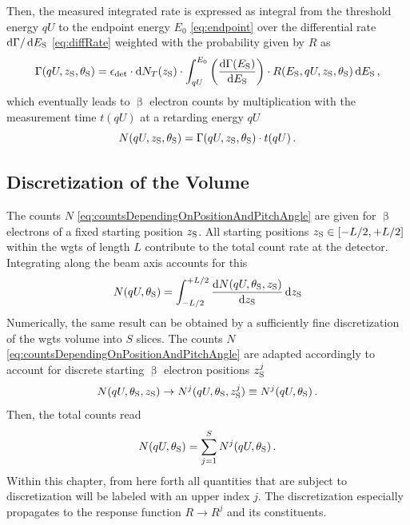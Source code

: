 Then, the measured integrated rate is expressed as integral from the threshold energy $qU$ to the endpoint energy $E_0$ \eqref{eq:endpoint} over the differential rate $\mathop{}\!\mathrm{d} \Gamma / \mathop{}\!\mathrm{d} E_\mathrm{S}$ \eqref{eq:diffRate} weighted with the probability given by $R$ as
\begin{equation}
\label{eq:rateDependingOnstartingValues}
\Gamma(qU, z_\mathrm{S}, \theta_\mathrm{S}) = 
\epsilon_\mathrm{det} \cdot
\mathop{}\!\mathrm{d} N_T(z_\mathrm{S}) \cdot
\int_{qU}^{E_0} 
    \left(\frac{\mathop{}\!\mathrm{d} \Gamma(E_\mathrm{S})}{\mathop{}\!\mathrm{d} E_\mathrm{S}}\right) \cdot 
    R(E_\mathrm{S}, qU, z_\mathrm{S}, \theta_\mathrm{S}) 
\mathop{}\!\mathrm{d} E_\mathrm{S}
\text{\,,}
\end{equation}
which eventually leads to $\upbeta$ electron counts by multiplication with the measurement time $t(qU)$ at a retarding energy $qU$
\begin{equation}
    \label{eq:countsDependingOnPositionAndPitchAngle}
    N(qU, z_\mathrm{S}, \theta_\mathrm{S}) = \Gamma(qU, z_\mathrm{S}, \theta_\mathrm{S}) \cdot t(qU)
    \text{\,.}
\end{equation}

\subsection{Discretization of the  Volume}
\label{sec:sourceDiscretization}
The counts $N$ \eqref{eq:countsDependingOnPositionAndPitchAngle} are given for $\upbeta$ electrons of a fixed starting position $z_\mathrm{S}$.
All starting positions $z_\mathrm{S} \in [-L/2, +L/2]$ within the \gls{wgts} of length $L$ contribute to the total count rate at the detector. Integrating along the beam axis accounts for this
\begin{equation}
    N(qU, \theta_\mathrm{S}) = \int_{-L/2}^{+L/2} \frac{\mathop{}\!\mathrm{d} N(qU, \theta_\mathrm{S}, z_\mathrm{S})}{\mathop{}\!\mathrm{d} z_\mathrm{S}} \mathop{}\!\mathrm{d} z_\mathrm{S}
\end{equation}
Numerically, the same result can be obtained by a sufficiently fine discretization of the \gls{wgts} volume into $S$ slices. The counts $N$ \eqref{eq:countsDependingOnPositionAndPitchAngle} are adapted accordingly to account for discrete starting $\upbeta$ electron positions $z_\mathrm{S}^j$
\begin{equation}
    N(qU, \theta_\mathrm{S}, z_\mathrm{S}) \rightarrow N^j(qU, \theta_\mathrm{S},z_\mathrm{S}^j) \equiv N^j(qU, \theta_\mathrm{S}) \text{\,.}
\end{equation}
Then, the total counts read
\begin{equation}
    \label{eq:nonAveragedCounts}
    N(qU, \theta_\mathrm{S}) = \sum_{j=1}^S N^j(qU, \theta_\mathrm{S}) \text{\,.}
\end{equation}
Within this chapter, from here forth all quantities that are subject to discretization will be labeled with an upper index $j$. The discretization especially propagates to the response function $R \rightarrow R^j$ and its constituents.

